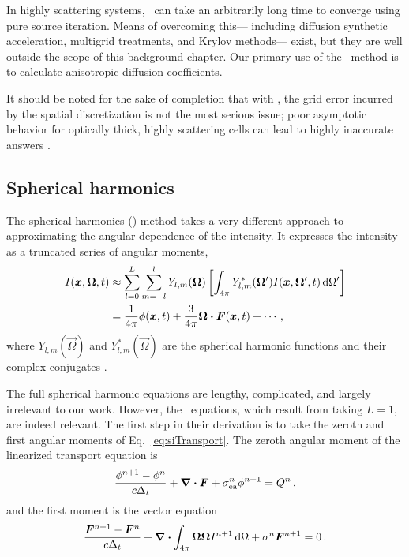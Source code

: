 In highly scattering systems, \SN\ can take an arbitrarily long time to converge
using pure source iteration. Means of overcoming this---%
including diffusion
synthetic acceleration, multigrid treatments, and Krylov methods---%
exist, but they are well
outside the scope of this background chapter. Our primary use of the \SN\ method
is to calculate anisotropic diffusion coefficients.

It should be noted for the sake of completion that with \SN, the grid error incurred
by the spatial discretization is not the most serious issue; poor asymptotic behavior
for optically thick, highly scattering cells can lead to highly inaccurate answers
\cite{Ada1998a,Ada2001}.

\subsection{Spherical harmonics}\label{sec:bgPn}
The spherical harmonics (\PN) method takes a very different approach to
approximating the angular dependence of the intensity. It expresses the
intensity as a truncated series of angular moments,
\begin{align*}
  I(\bm{x},\bm{\Omega},t)
  &\approx \sum_{l=0}^{L} \sum_{m=-l}^{l} Y_{l,m}(\bm{\Omega}) \left[
  \int_{4\pi} Y_{l,m}^\ast(\bm{\Omega}') I(\bm{x},\bm{\Omega}',t) \mathop{}\!\mathrm{d} \Omega'
  \right]
  \\
  &= \frac{1}{4\pi} \phi(\bm{x}, t) + \frac{3}{4\pi} \bm{\Omega}\bm{\cdot}
  \bm{F}(\bm{x},t) + \cdots\,,
\end{align*}
where $Y_{l,m}(\vec{\Omega})$ and $Y_{l,m}^*(\vec{\Omega})$ are the spherical
harmonic functions and their complex conjugates \cite{McC2008a,Lar2007}.

The full spherical harmonic equations \cite{McC2007} are lengthy, complicated, and
largely irrelevant to our work. However, the \Pone\ equations, which result from
taking $L=1$, are indeed relevant. The first step in their derivation is to take the
zeroth and first angular moments of Eq.~\eqref{eq:siTransport}. The zeroth
angular moment of the linearized transport equation is
\begin{equation}\label{eq:p1ZerothMoment}
  \frac{\phi^{n+1} - \phi^n }{c \Delta_t}
  + \bm{\nabla} \bm{\cdot} \bm{F}
  + \sigma_\mathrm{ea}^n \phi^{n+1}
  = Q^n\,,
\end{equation}
and the first moment is the vector equation
\begin{equation}\label{eq:p1FirstMoment}
  \frac{\bm{F}^{n+1} - \bm{F}^n }{c \Delta_t} + \bm{\nabla} \bm{\cdot} \int_{4\pi}
  \bm{\Omega}\bm{\Omega} I^{n+1} \mathop{}\!\mathrm{d}\Omega
  + \sigma^n \bm{F}^{n+1}
  = 0\,.
\end{equation}

